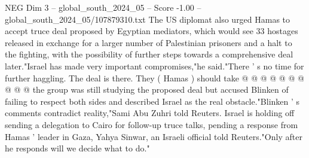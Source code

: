 \begin{textsample}{NEG Dim 3 – global\_south\_2024\_05 – Score -1.00 – global\_south\_2024\_05/107879310.txt}
The US diplomat also urged Hamas to accept truce deal proposed by Egyptian mediators, which would see 33 hostages released in exchange for a larger number of Palestinian prisoners and a halt to the fighting, with the possibility of further steps towards a comprehensive deal later."Israel has made very important compromises,"he said."There ' s no time for further haggling.
The deal is there.
They ( Hamas ) should take @ @ @ @ @ @ @ @ @ @ the group was still studying the proposed deal but accused Blinken of failing to respect both sides and described Israel as the real obstacle."Blinken ' s comments contradict reality,"Sami Abu Zuhri told Reuters.
Israel is holding off sending a delegation to Cairo for follow-up truce talks, pending a response from Hamas ' leader in Gaza, Yahya Sinwar, an Israeli official told Reuters."Only after he responds will we decide what to do."

\end{textsample}
